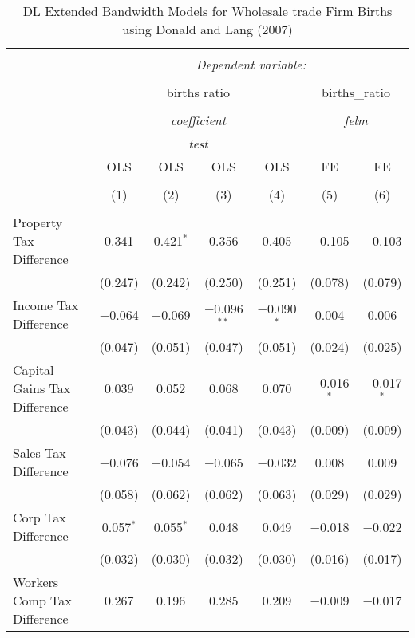 
\begin{table}[!htbp] \centering 
  \caption{DL Extended Bandwidth Models for  Wholesale trade Firm Births using Donald and Lang (2007)} 
  \label{} 
\begin{tabular}{@{\extracolsep{5pt}}lcccccc} 
\\[-1.8ex]\hline 
\hline \\[-1.8ex] 
 & \multicolumn{6}{c}{\textit{Dependent variable:}} \\ 
\cline{2-7} 
\\[-1.8ex] & \multicolumn{4}{c}{births ratio} & \multicolumn{2}{c}{births\_ratio} \\ 
\\[-1.8ex] & \multicolumn{4}{c}{\textit{coefficient}} & \multicolumn{2}{c}{\textit{felm}} \\ 
 & \multicolumn{4}{c}{\textit{test}} & \multicolumn{2}{c}{\textit{}} \\ 
 & OLS & OLS & OLS & OLS & FE & FE \\ 
\\[-1.8ex] & (1) & (2) & (3) & (4) & (5) & (6)\\ 
\hline \\[-1.8ex] 
 Property Tax Difference & 0.341 & 0.421$^{*}$ & 0.356 & 0.405 & $-$0.105 & $-$0.103 \\ 
  & (0.247) & (0.242) & (0.250) & (0.251) & (0.078) & (0.079) \\ 
  Income Tax Difference & $-$0.064 & $-$0.069 & $-$0.096$^{**}$ & $-$0.090$^{*}$ & 0.004 & 0.006 \\ 
  & (0.047) & (0.051) & (0.047) & (0.051) & (0.024) & (0.025) \\ 
  Capital Gains Tax Difference & 0.039 & 0.052 & 0.068 & 0.070 & $-$0.016$^{*}$ & $-$0.017$^{*}$ \\ 
  & (0.043) & (0.044) & (0.041) & (0.043) & (0.009) & (0.009) \\ 
  Sales Tax Difference & $-$0.076 & $-$0.054 & $-$0.065 & $-$0.032 & 0.008 & 0.009 \\ 
  & (0.058) & (0.062) & (0.062) & (0.063) & (0.029) & (0.029) \\ 
  Corp Tax Difference & 0.057$^{*}$ & 0.055$^{*}$ & 0.048 & 0.049 & $-$0.018 & $-$0.022 \\ 
  & (0.032) & (0.030) & (0.032) & (0.030) & (0.016) & (0.017) \\ 
  Workers Comp Tax Difference & 0.267 & 0.196 & 0.285 & 0.209 & $-$0.009 & $-$0.017 \\ 

\end{tabular}
\end{table}
